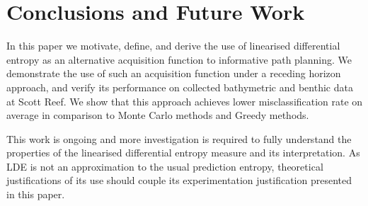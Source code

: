 \documentclass{article}
\begin{document}
%		
%	
%		
%
%				

					

		


		
		

		

					

	

		
		
\section{Conclusions and Future Work}
\label{Section:Conclusion}

	In this paper we motivate, define, and derive the use of linearised differential entropy as an alternative acquisition function to informative path planning. We demonstrate the use of such an acquisition function under a receding horizon approach, and verify its performance on collected bathymetric and benthic data at Scott Reef. We show that this approach achieves lower misclassification rate on average in comparison to Monte Carlo methods and Greedy methods.
	
	This work is ongoing and more investigation is required to fully understand the properties of the linearised differential entropy measure and its interpretation. As LDE is not an approximation to the usual prediction entropy, theoretical justifications of its use should couple its experimentation justification presented in this paper.
	
\end{document}
